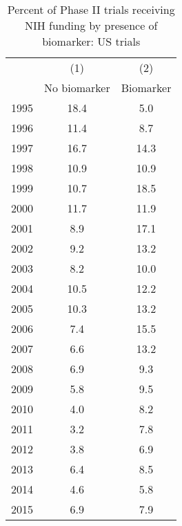 \begin{table}[htbp]\centering
\caption{Percent of Phase II trials receiving NIH funding by presence of biomarker: US trials}
\begin{tabular}{l*{2}{c}}
\hline\hline
                    &\multicolumn{1}{c}{(1)}&\multicolumn{1}{c}{(2)}\\
                    &\multicolumn{1}{c}{No biomarker}&\multicolumn{1}{c}{Biomarker}\\
\hline
1995                &        18.4&         5.0\\
1996                &        11.4&         8.7\\
1997                &        16.7&        14.3\\
1998                &        10.9&        10.9\\
1999                &        10.7&        18.5\\
2000                &        11.7&        11.9\\
2001                &         8.9&        17.1\\
2002                &         9.2&        13.2\\
2003                &         8.2&        10.0\\
2004                &        10.5&        12.2\\
2005                &        10.3&        13.2\\
2006                &         7.4&        15.5\\
2007                &         6.6&        13.2\\
2008                &         6.9&         9.3\\
2009                &         5.8&         9.5\\
2010                &         4.0&         8.2\\
2011                &         3.2&         7.8\\
2012                &         3.8&         6.9\\
2013                &         6.4&         8.5\\
2014                &         4.6&         5.8\\
2015                &         6.9&         7.9\\
\hline\hline
\end{tabular}
\end{table}
